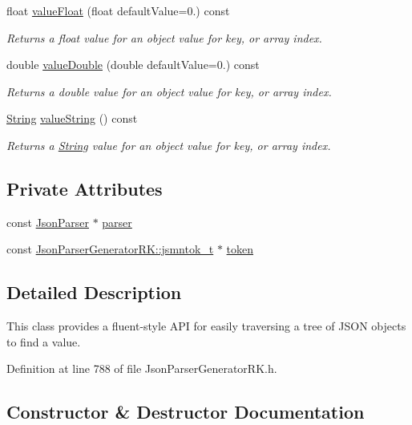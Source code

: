 \begin{DoxyCompactItemize}
float \hyperlink{class_json_reference_afa346d628f8ecb4ad2b7a67c7634a85c}{value\+Float} (float default\+Value=0.) const
\begin{DoxyCompactList}\small\item\em Returns a float value for an object value for key, or array index. \end{DoxyCompactList}\item 
double \hyperlink{class_json_reference_a670c3313ff8bc1399ce0a6efdad3b0db}{value\+Double} (double default\+Value=0.) const
\begin{DoxyCompactList}\small\item\em Returns a double value for an object value for key, or array index. \end{DoxyCompactList}\item 
\hyperlink{class_string}{String} \hyperlink{class_json_reference_ab9dfec23570193b9ab1d16b07fba6022}{value\+String} () const
\begin{DoxyCompactList}\small\item\em Returns a \hyperlink{class_string}{String} value for an object value for key, or array index. \end{DoxyCompactList}\end{DoxyCompactItemize}
\subsection*{Private Attributes}
\begin{DoxyCompactItemize}
\item 
const \hyperlink{class_json_parser}{Json\+Parser} $\ast$ \hyperlink{class_json_reference_a37fb436fae63e7e452fc2325eddf3e8b}{parser}
\item 
const \hyperlink{struct_json_parser_generator_r_k_1_1jsmntok__t}{Json\+Parser\+Generator\+R\+K\+::jsmntok\+\_\+t} $\ast$ \hyperlink{class_json_reference_a895a16fb8f781504fe39efd194ed5232}{token}
\end{DoxyCompactItemize}


\subsection{Detailed Description}
This class provides a fluent-\/style A\+PI for easily traversing a tree of J\+S\+ON objects to find a value. 

Definition at line 788 of file Json\+Parser\+Generator\+R\+K.\+h.



\subsection{Constructor \& Destructor Documentation}
\mbox{\label{class_json_reference_aa4d71b4a5c47270192b92b23b20ca149}} 
